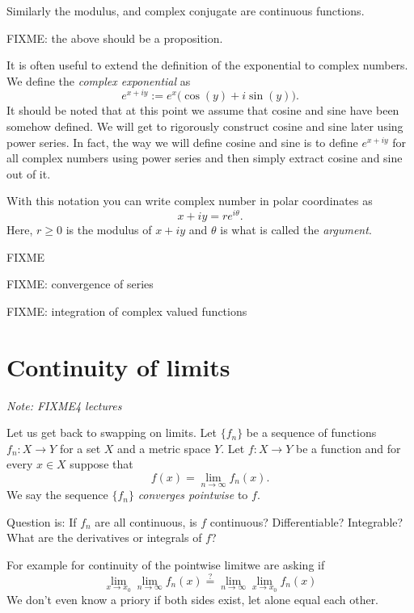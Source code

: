 \documentclass[12pt]{book}
\newcommand{\myindex}[1]{#1\index{#1}}
\newcommand{\sectionnotes}[1]{\noindent \emph{Note: #1} \medskip \par}
\newcommand{\sectionnewpage}{\clearpage}
\theoremstyle{plain}
\theoremstyle{remark}
\theoremstyle{definition}
\theoremstyle{exercise}
\theoremstyle{example}
\begin{document}
Similarly the modulus, and complex conjugate are continuous functions.

FIXME: the above should be a proposition.

It is often useful to extend the definition of the exponential to complex
numbers.  We define the \emph{\myindex{complex exponential}} as
\begin{equation*}
e^{x+iy} := e^x \bigl( \cos(y) + i \sin(y) \bigr) .
\end{equation*}
It should be noted that at this point we assume that cosine and sine
have been somehow defined.  We will get to rigorously
construct cosine and sine later using power series.  In fact,
the way we will define cosine and sine is to define 
$e^{x+iy}$ for all complex numbers using power series and then simply
extract cosine and sine out of it.

With this notation you can write complex number in polar coordinates
as
\begin{equation*}
x+iy = r e^{i\theta} .
\end{equation*}
Here, $r \geq 0$ is the modulus of $x+iy$ and $\theta$ is what is called
the \emph{\myindex{argument}}.

FIXME

FIXME: convergence of series

FIXME: integration of complex valued functions



\sectionnewpage
\section{Continuity of limits}
\label{sec:FIXME}

\sectionnotes{FIXME4 lectures}

Let us get back to swapping on limits.  Let $\{ f_n \}$ be a sequence
of functions $f_n \colon X \to Y$ for a set $X$ and a metric space $Y$.
Let $f \colon X \to Y$ be a
function and for every $x \in X$ suppose that
\begin{equation*}
f(x) = \lim_{n\to \infty} f_n(x) .
\end{equation*}
We say the sequence $\{ f_n \}$ \emph{converges pointwise} to
$f$.

Question is:
If $f_n$ are all continuous, is $f$ continuous?  Differentiable?
Integrable?  What are the derivatives or integrals of $f$?

For example for continuity of the pointwise limitwe are asking if
\begin{equation}
\lim_{x\to x_0} \lim_{n\to\infty} f_n(x)
\overset{?}{=}
\lim_{n\to\infty} \lim_{x\to x_0} f_n(x)
\end{equation}
We don't even know a priory if both sides exist, let alone equal each other.
\end{document}
